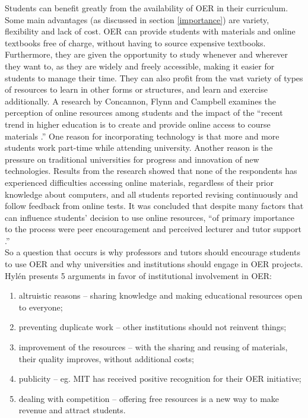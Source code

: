 \documentclass[a4paper]{article}
\begin{document}
\noindent 
Students can benefit greatly from the availability of OER in their curriculum. Some main advantages (as discussed in section \ref{importance}) are variety, flexibility and lack of cost. OER can provide students with materials and online textbooks free of charge, without having to source expensive textbooks. Furthermore, they are given the opportunity to study whenever and wherever they want to, as they are widely and freely accessible, making it easier for students to manage their time. They can also profit from the vast variety of types of resources to learn in other forms or structures, and learn and exercise additionally. A research by Concannon, Flynn and Campbell \cite{elearning} examines the perception of online resources among students and the impact of the ``recent trend in higher education is to create and provide online access to course materials \cite{elearning}.'' One reason for incorporating technology is that more and more students work part-time while attending university. Another reason is the pressure on traditional universities for progress and innovation of new technologies. Results from the research showed that none of the respondents has experienced difficulties accessing online materials, regardless of their prior knowledge about computers, and all students reported revising continuously and follow feedback from online tests. It was concluded that despite many factors that can influence students' decision to use online resources, ``of primary importance to the process were peer encouragement and perceived lecturer and tutor support \cite{elearning}.'' \\

\noindent
So a question that occurs is why professors and tutors should encourage students to use OER and why universities and institutions should engage in OER projects. Hyl\'{e}n \cite{arguments} presents 5 arguments in favor of institutional involvement in OER:

\begin{enumerate}
\item altruistic reasons -- sharing knowledge and making educational resources open to everyone;
\item preventing duplicate work -- other institutions should not reinvent things;
\item improvement of the resources -- with the sharing and reusing of materials, their quality improves, without additional costs;
\item publicity -- eg. MIT has received positive recognition for their OER initiative;
\item dealing with competition -- offering free resources is a new way to make revenue and attract students.
\end{enumerate}
\end{document}

